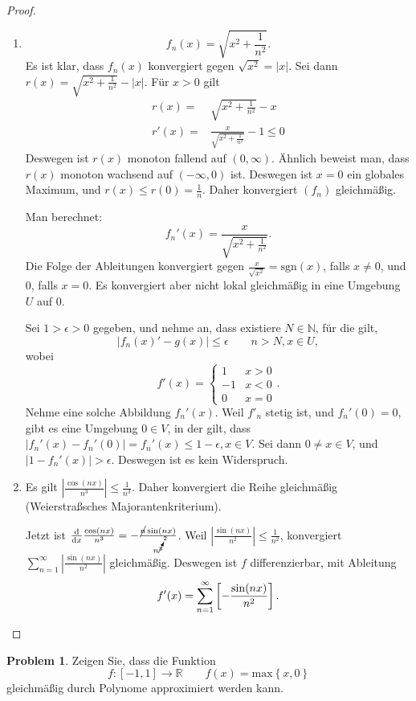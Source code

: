 \documentclass[prb,12pt]{revtex4-2}
\theoremstyle{definition}
\newtheorem{Problem}{Problem}
\theoremstyle{definition}
\newcommand{\N}{\mathbb{N}}
\newcommand{\R}{\mathbb{R}}
\begin{document}
\begin{proof}
	\begin{enumerate}[label=\roman*)]
		\item \[
		f_n(x)=\sqrt{x^2+\frac{1}{n^2}} 
		.\] 
		Es ist klar, dass $f_n(x)$ konvergiert gegen $\sqrt{x^2} =|x|$. Sei dann $r(x)=\sqrt{x^2+\frac{1}{n^2}} -|x|$. F\"{u}r $x>0$ gilt
		\begin{align*}
			r(x)=& \sqrt{x^2+\frac{1}{n^2}}-x\\
			r'(x)=& \frac{x}{\sqrt{x^2+\frac{1}{n^2}} }-1\le 0
		\end{align*}
		Deswegen ist $r(x)$ monoton fallend auf $(0,\infty)$. Ähnlich beweist man, dass $r(x)$ monoton wachsend auf $(-\infty, 0)$ ist. Deswegen ist $x=0$ ein globales Maximum, und $r(x)\le r(0)=\frac{1}{n}$. Daher konvergiert $(f_n)$ gleichmäßig.

		Man berechnet:
		\[
			f_n'(x)=\frac{x}{\sqrt{x^2+\frac{1}{n^2}} }
		.\] 
		Die Folge der Ableitungen konvergiert gegen $\frac{x}{\sqrt{x^2} }=\text{sgn}(x)$, falls $x\neq 0$, und $0$, falls $x=0$. Es konvergiert aber nicht lokal gleichmäßig in eine Umgebung $U$ auf $0$.

		Sei $1>\epsilon>0$ gegeben, und nehme an, dass existiere $N\in \N$, f\"{u}r die gilt, 
		\[
		|f_n(x)'-g(x)|\le \epsilon\qquad n>N,x\in U
		,\] 
		wobei
		\[
		f'(x)=\begin{cases}
			1 & x > 0\\
			-1 & x < 0\\
			0 & x = 0
		\end{cases}
		.\] 
Nehme eine solche Abbildung $f_n'(x)$. Weil $f'_n$ stetig ist, und $f_n'(0)=0$, gibt es eine Umgebung $0\in V$, in der gilt, dass $|f_n'(x)-f_n'(0)|=f_n'(x)\le 1-\epsilon, x\in V$. Sei dann  $0\neq x\in V$, und $|1-f_n'(x)|>\epsilon$. Deswegen ist es kein Widerspruch.
\item Es gilt $\left|\frac{\cos(nx)}{n^3}\right|\le \frac{1}{n^3}$. Daher konvergiert die Reihe gleichmäßig (Weierstraßsches Majorantenkriterium).

	Jetzt ist $\dv{x} \frac{\cos(nx)}{n^3}=-\frac{\cancel{n}\sin(nx)}{n^{\cancelto{2}{3}}}$. Weil $\left|\frac{\sin(nx)}{n^2}\right|\le \frac{1}{n^2}$, konvergiert $\sum_{n=1}^{\infty} \left| \frac{\sin(nx)}{n^2} \right|$ gleichmäßig. Deswegen ist $f$ differenzierbar, mit Ableitung
	\[
		f'(x)=\sum_{n=1}^{\infty} \left[ -\frac{\sin(nx)}{n^2} \right] 
	.\qedhere\] 
\end{enumerate}
\end{proof}
\begin{Problem}
	Zeigen Sie, dass die Funktion
	\[f:[-1,1]\to\R\qquad f(x)=\text{max}\left\{ x,0 \right\} \]
	gleichmäßig durch Polynome approximiert werden kann.
\end{Problem}
\end{document}
